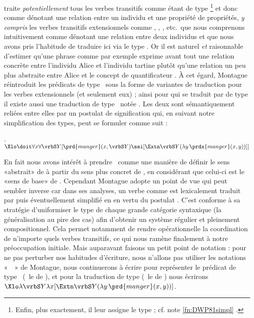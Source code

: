 \sloppy
\citet{PTQ} traite \emph{potentiellement} {tous} les verbes transitifs comme étant de type \footnote{Enfin, plus exactement, il leur assigne le type  ; cf. note \ref{fn:DWP81simpl} .}
et donc comme dénotant une relation entre un individu et une propriété de propriétés, 
\emph{y compris} les verbes transitifs extensionnels comme , , , etc.\  que nous comprenons intuitivement comme dénotant une relation entre deux individus et que nous avons pris l'habitude de traduire ici via le type \eet.
Or il est naturel \emph{et} raisonnable d'estimer qu'une phrase comme par exemple  exprime avant tout une relation concrète entre l'individu Alice et l'individu tartine plutôt qu'une relation un peu plus abstraite entre Alice et le concept de quantificateur . 
À cet égard, Montague réintroduit les prédicats de type \eet\ sous la forme de variantes de traduction pour les verbes extensionnels (et seulement eux) ; ainsi pour  qui se traduit par  de type  il existe aussi une traduction de type \eet\ notée 
.
Les deux  sont sémantiquement reliées entre elles par un postulat de signification qui, en suivant notre simplification des types, peut se formuler comme suit :

\ex.
\(\Xlo\doit\forall x\forall\vrbS Y  [ \prd{manger}(x,\vrbS Y) \ssi [\Extn\vrbS Y(\lambda y\,\prdx{manger}(x,y))] ]\)


\fussy


En fait nous avons intérêt à prendre \Last\ comme une manière de définir le sens «abstrait» de  à partir du sens plus concret de , en considérant que celui-ci est le «sens de base» de .
Cependant Montague adopte un point de vue qui peut sembler inverse car dans ses analyses, un verbe comme  est lexicalement %
traduit par  puis éventuellement simplifié en  en vertu du postulat \Last.
C'est conforme à sa stratégie d'uniformiser le type de chaque grande catégorie syntaxique (la généralisation au pire des cas) afin d'obtenir un système régulier et pleinement compositionnel. 
Cela permet notamment de rendre opérationnelle la coordination de n'importe quels verbes transitifs, ce qui nous ramène finalement à notre préoccupation initiale.  Mais auparavant faisons un petit point de notation : pour ne pas perturber nos habitudes d'écriture, nous n'allons pas utiliser les notations «~\prdx{}~» de Montague, nous continuerons à écrire  pour représenter le prédicat de type \eet\ (\ie\ le  de \Last), et pour la traduction de  
type  (\ie\ le  de \Last) nous écrirons 
$\Xlo\lambda\vrbS Y\lambda x[\Extn\vrbS Y(\lambda y\,\prd{manger}(x,y))]$.

